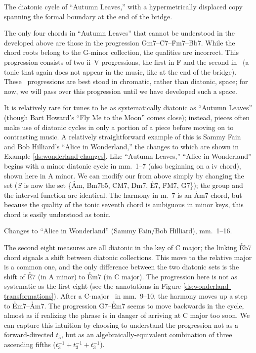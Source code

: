 \documentclass[diss]{subfiles}
\begin{document}
\figBeg[htbp]
  \caption{The diatonic cycle of “Autumn Leaves,” with a hypermetrically
    displaced copy spanning the formal boundary at the end of the bridge.}
  \label{ds:displaced-cycle}
\figEnd

The only four chords in “Autumn Leaves” that cannot be understood in the \gis{}
developed above are those in the progression
\h{Gm7}--\h{C7}--\h{Fm7}--\h{Bb7}.  While the chord roots belong to the
G-minor collection, the qualities are incorrect. This progression consists of
two \mbox{ii--V} progressions, the first in F and the second
in \Eflat\ (a tonic that again does not appear in the music, like at the end
of the bridge). These \tf\ progressions are best stood in chromatic, rather
than diatonic, space; for now, we will pass over this progression until we
have developed such a space.

It is relatively rare for tunes to be as systematically diatonic as “Autumn
Leaves” (though Bart Howard’s “Fly Me to the Moon” comes close); instead,
pieces often make use of diatonic cycles in only a portion of a piece before
moving on to contrasting music. A relatively straightforward example of this
is Sammy Fain and Bob Hilliard’s “Alice in Wonderland,” the changes to which
are shown in Example \ref{ds:wonderland-changes}. Like “Autumn
Leaves,” “Alice in Wonderland” begins with a minor diatonic cycle in mm.~1--7
(also beginning on a iv chord), shown here in A minor. We can modify our \gis{}
from above simply by changing the set ($S$ is now the set \{\h{Am}, \h{Bm7b5},
\h{CM7}, \h{Dm7}, \h{E7}, \h{FM7}, \h{G7}\}); the group \ivls{} and the
interval function are identical. The harmony in m.~7 is an \h{Am7} chord,
but because the quality of the tonic seventh chord is ambiguous in minor
keys, this chord is easily understood as tonic.

\exBeg[htbp]
  \caption{Changes to “Alice in Wonderland” (Sammy Fain/Bob Hilliard), mm.\
  1--16.}
  \label{ds:wonderland-changes}
\exEnd

The second eight measures are all diatonic in the key of C major; the linking
\h{Eb7} chord signals a shift between diatonic collections.\fn{ds-14} This
move to the relative major is a common one, and the only difference between
the two diatonic sets is the shift of \h{E7} (in A minor) to \h{Em7} (in C
major). The progression here is not as systematic as the first eight (see the
annotations in Figure \ref{ds:wonderland-transformations}). After a C-major
\tf\ in mm.~9--10, the harmony moves up a step to \h{Em7}--\h{Am7}.
The progression \h{G7}--\h{Em7} seems to move backwards in the cycle, almost
as if realizing the phrase is in danger of arriving at C major too soon. We
can capture this intuition by choosing to understand the progression not as a
forward-directed $t_5$, but as an algebraically-equivalent combination of
three ascending fifths ($t_3^{-1} + t_3^{-1} + t_3^{-1}$).
\end{document}
